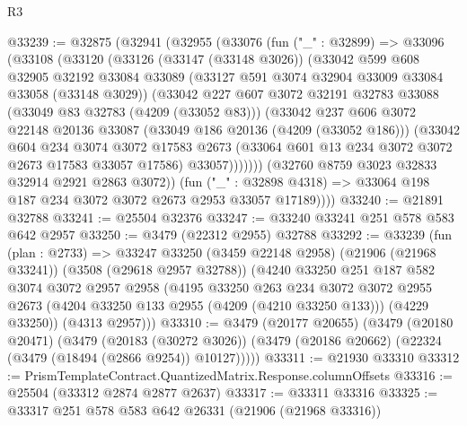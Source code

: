 \begin{lexlean}{R3}
\begin{coremodule}
@33239 := @32875
    (@32941
      (@32955
        (@33076
          (fun ("_" : @32899) =>
          @33096
            (@33108
              (@33120
                (@33126
                  (@33147 (@33148 @3026))
                  (@33042
                    @599
                    @608
                    @32905
                    @32192
                    @33084
                    @33089
                    (@33127 @591 @3074 @32904 @33009 @33084 @33058 (@33148 @3029))
                    (@33042
                      @227
                      @607
                      @3072
                      @32191
                      @32783
                      @33088
                      (@33049 @83 @32783 (@4209 (@33052 @83)))
                      (@33042
                        @237
                        @606
                        @3072
                        @22148
                        @20136
                        @33087
                        (@33049 @186 @20136 (@4209 (@33052 @186)))
                        (@33042
                          @604
                          @234
                          @3074
                          @3072
                          @17583
                          @2673
                          (@33064 @601 @13 @234 @3072 @3072 @2673 @17583 @33057 @17586)
                          @33057)))))))
            (@32760 @8759 @3023 @32833 @32914 @2921 @2863 @3072))
          (fun ("_" : @32898 @4318) =>
          @33064 @198 @187 @234 @3072 @3072 @2673 @2953 @33057 @17189))))
@33240 := @21891 @32788
@33241 := @25504 @32376
@33247 := @33240 @33241 @251 @578 @583 @642 @2957
@33250 := @3479 (@22312 @2955) @32788
@33292 := @33239
    (fun (plan : @2733) =>
    @33247
      @33250
      (@3459 @22148 @2958)
      (@21906 (@21968 @33241))
      (@3508 (@29618 @2957 @32788))
      (@4240
        @33250
        @251
        @187
        @582
        @3074
        @3072
        @2957
        @2958
        (@4195
          @33250
          @263
          @234
          @3072
          @3072
          @2955
          @2673
          (@4204 @33250 @133 @2955 (@4209 (@4210 @33250 @133)))
          (@4229 @33250))
        (@4313 @2957)))
@33310 := @3479
    (@20177 @20655)
    (@3479
      (@20180 @20471)
      (@3479
        (@20183 (@30272 @3026))
        (@3479 (@20186 @20662) (@22324 (@3479 (@18494 (@2866 @9254)) @10127)))))
@33311 := @21930 @33310
@33312 := PrismTemplateContract.QuantizedMatrix.Response.columnOffsets
@33316 := @25504 (@33312 @2874 @2877 @2637)
@33317 := @33311 @33316
@33325 := @33317 @251 @578 @583 @642 @26331 (@21906 (@21968 @33316))

\end{coremodule}
\end{lexlean}
